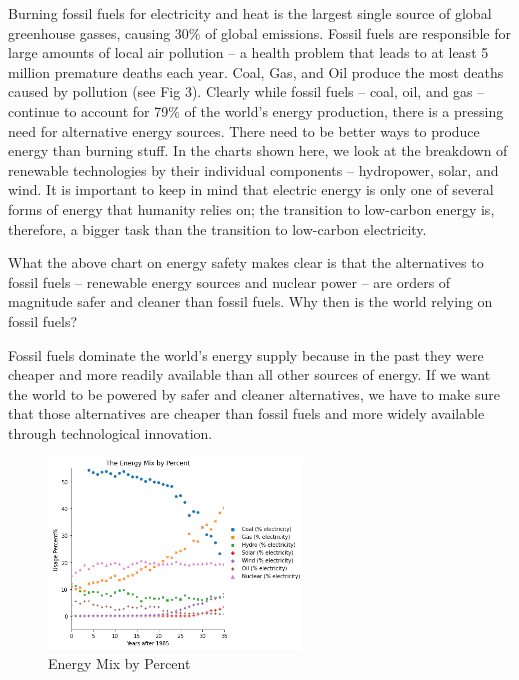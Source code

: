 \documentclass[10pt,twocolumn,letterpaper]{article}
\begin{document}
Burning fossil fuels for electricity and heat is the largest single source of global greenhouse gasses, causing 30\% of global emissions. Fossil fuels are responsible for large amounts of local air pollution – a health problem that leads to at least 5 million premature deaths each year. Coal, Gas, and Oil produce the most deaths caused by pollution (see Fig 3). Clearly while fossil fuels – coal, oil, and gas – continue to account for 79\% of the world’s energy production, there is a pressing need for alternative energy sources. There need to be better ways to produce energy than burning stuff. In the charts shown here, we look at the breakdown of renewable technologies by their individual components – hydropower, solar, and wind. It is important to keep in mind that electric energy is only one of several forms of energy that humanity relies on; the transition to low-carbon energy is, therefore, a bigger task than the transition to low-carbon electricity. 

What the above chart on energy safety makes clear is that the alternatives to fossil fuels – renewable energy sources and nuclear power – are orders of magnitude safer and cleaner than fossil fuels. Why then is the world relying on fossil fuels? 

Fossil fuels dominate the world’s energy supply because in the past they were cheaper and more readily available than all other sources of energy. If we want the world to be powered by safer and cleaner alternatives, we have to make sure that those alternatives are cheaper than fossil fuels and more widely available through technological innovation. 

{\scriptsize
\begin{figure}[h!]
    \centering
    \includegraphics[width=0.6\textwidth]{figures/the_energy_mix_by_percent.PNG}
    \caption{Energy Mix by Percent }

\end{figure}
}
\end{document}
